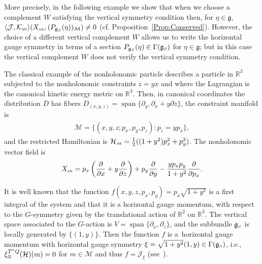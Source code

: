 \documentclass[pdftex]{sigma}
\numberwithin{equation}{section}
\def\W{\mathcal{W}}
\def\M{\mathcal{M}}
\def\J{\mathcal{J}}
\def\Ham{\mathcal{H}}
\def\R{\mathbb{R}}
\def\g{\mathfrak{g}}
\def\nh{{\mbox{\tiny{nh}}}}
\def\subW{{\mbox{\tiny{$\W$}}}}
\def\subM{{\mbox{\tiny{$\M$}}}}
\def\subSS{{\mbox{\tiny{$S$}}}}
\def\subQQ{{\mbox{\tiny{$Q$}}}}
\begin{document}
More precisely, in the following example we show that when we choose a
complement $W$ satisfying the vertical symmetry
condition then, for $\eta\in \g$,   $\langle \mathcal{J},\mathcal{K}_\subW\rangle (X_\nh,( P_{\mathfrak{g}_\subSS}(\eta))_\M ) \neq 0$  (cf. Proposition~\ref{Prop:Conserved}).
However, the choice of a dif\/ferent vertical complement $W$ allows us to write the horizontal gauge symmetry in terms of a section $P_{\g_S}(\eta)\in \Gamma(\g_\subSS)$ for $\eta\in\g$; but in this case the vertical complement $W$ does not verify the vertical symmetry condition.

 \begin{Example}
 The classical example of the nonholonomic particle describes a particle in $\R^3$
 subjected to the nonholonomic constraints $\dot z = y \dot x$ and where the
 Lagrangian is the canonical kinetic energy metric on $\R^3$. Then, in canonical coordinates
 the distribution $D$ has f\/ibers $D_{(x,y,z)} = \operatorname{span}\{ \partial_y, \partial_x+y\partial z \}$,
 the constraint manifold is
 \begin{gather*}
 \M = \{(x,y,z; p_x ,p_y , p_z)\colon  p_z = yp_x \},
 \end{gather*}
 and the restricted Hamiltonian is $\Ham_\subM = \frac{1}{2} ( (1+y^2)p_x^2+p_y^2 )$.
 The nonholonomic vector f\/ield is
 \begin{gather*}
 X_\nh = p_x\left(\frac{\partial}{\partial x} + y\frac{\partial}{\partial z} \right) + p_y\frac{\partial}{\partial y} - \frac{yp_xp_y}{1+y^2} \frac{\partial}{\partial p_x}.
 \end{gather*}

It is well known that the function $f(x,y,z,p_x,p_y) = p_x   \sqrt{1+y^2}$
is a f\/irst integral of the system and that it is a horizontal gauge momentum,
with respect to the $G$-symmetry given by the translational action of $\R^2$ on $\R^3$.
The vertical space associated to the $G$-action is $V = \operatorname{span}\{ \partial_x, \partial_z \}$, and
the subbundle $\g_\subSS$ is locally generated by $\{(1,y)\}$.
Then the function $f$ is a~horizontal gauge momentum with horizontal gauge symmetry
 $\xi =\sqrt{1+y^2}  (1,y) \in \Gamma(\mathfrak{g}_\subSS)$, i.e., $\xi_\subQQ^{T^*Q}(\Ham)(m)=0$ for $m\in\M$ and thus $f=\J_\xi$ (see~\cite{FSG2008}).


\end{Example}
\end{document}
